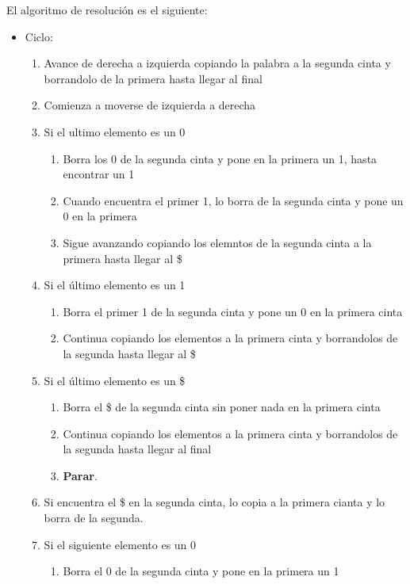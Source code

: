 El algoritmo de resolución es el siguiente:

\begin{itemize}
    \item Ciclo:
    \begin{enumerate}
        \item Avance de derecha a izquierda copiando la palabra a la segunda cinta y borrandolo de la primera hasta llegar al final
        \item Comienza a moverse de izquierda a derecha
        \item Si el ultimo elemento es un 0
        \begin{enumerate}
            \item Borra los 0 de la segunda cinta y pone en la primera un 1, hasta encontrar un 1
            \item Cuando encuentra el primer 1, lo borra de la segunda cinta y pone un 0 en la primera
            \item Sigue avanzando copiando los elemntos de la segunda cinta a la primera hasta llegar al \$
        \end{enumerate}
        \item Si el último elemento es un 1   
        \begin{enumerate}
            \item Borra el primer 1 de la segunda cinta y pone un 0 en la primera cinta
            \item Continua copiando los elementos a la primera cinta y borrandolos de la segunda hasta llegar al \$
        \end{enumerate} 
        \item Si el último elemento es un \$
        \begin{enumerate}
            \item Borra el \$ de la segunda cinta sin poner nada en la primera cinta
            \item Continua copiando los elementos a la primera cinta y borrandolos de la segunda hasta llegar al final
            \item \textbf{Parar}.
        \end{enumerate} 
        \item Si encuentra el \$ en la segunda cinta, lo copia a la primera cianta y lo borra de la segunda.
        \item Si el siguiente elemento es un 0
        \begin{enumerate}
            \item Borra el 0 de la segunda cinta y pone en la primera un 1

\end{enumerate}
\end{enumerate}
\end{itemize}
